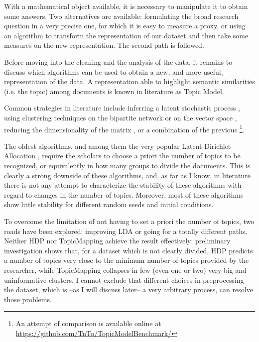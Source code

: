\documentclass[a4paper, 11pt, headings=standardclasses, tablecaptionsbelow]{scrartcl}
\begin{document}
With a mathematical object available, it is necessary to manipulate it to obtain some answers. Two alternatives are available: formulating the broad research question in a very precise one, for which it is easy to measure a proxy, or using an algorithm to transform the representation of our dataset and then take some measures on the new representation. The second path is followed.

Before moving into the cleaning and the analysis of the data, it remains to discuss which algorithms can be used to obtain a new, and more useful, representation of the data. A representation able to highlight semantic similarities (i.e. the topic) among documents is known in literature as Topic Model.

Common strategies in literature include inferring a latent stochastic process \parencite{blei2003,teh2005,griffiths2004,hofmann1999}, using clustering techniques on the bipartite network \parencite{gerlach2018} or on the vector space \parencite{angelov2020,grootendorst2022}, reducing the dimensionality of the matrix \parencite{kim2008}, or a combination of the previous \parencite{lancichinetti2015}\footnote{An attempt of comparison is available online at \url{https://github.com/TnTo/TopicModelBenchmark/}}.

The oldest algorithms, and among them the very popular Latent Dirichlet Allocation \parencite[LDA][]{blei2003}, require the scholars to choose a priori the number of topics to be recognized, or equivalently in how many groups to divide the documents. This is clearly a strong downside of these algorithms, and, as far as I know, in literature there is not any attempt to characterize the stability of these algorithms with regard to changes in the number of topics. Moreover, most of these algorithms show little stability for different random seeds and initial conditions.

To overcome the limitation of not having to set a priori the number of topics, two roads have been explored: improving LDA \parencite{teh2005,lancichinetti2015} or going for a totally different paths.
Neither HDP \parencite{teh2005} nor TopicMapping \parencite{lancichinetti2015} achieve the result effectively: preliminary investigation shows that, for a dataset which is not clearly divided, HDP predicts a number of topics very close to the minimum number of topics provided by the researcher, while TopicMapping collapses in few (even one or two) very big and uninformative clusters. I cannot exclude that different choices in preprocessing the dataset, which is --as I will discuss later-- a very arbitrary process, can resolve those problems.
\end{document}
